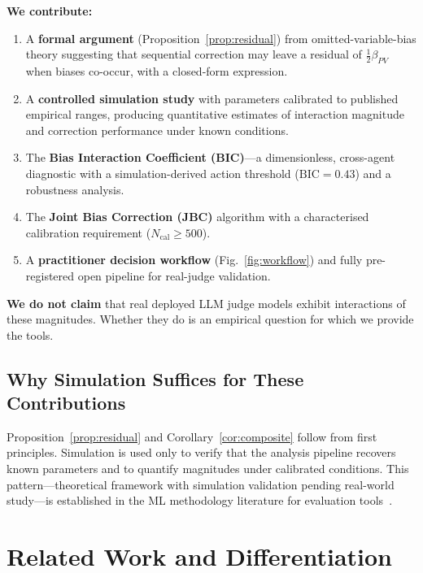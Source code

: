 \documentclass[10pt,conference]{IEEEtran}
\newcommand{\BIC}{\mathrm{BIC}}
\begin{document}
\textbf{We contribute:}
\begin{enumerate}
\item A \textbf{formal argument}
  (Proposition~\ref{prop:residual}) from
  omitted-variable-bias theory suggesting that sequential
  correction may leave a residual of $\frac{1}{2}\beta_{PV}$
  when biases co-occur, with a closed-form expression.

\item A \textbf{controlled simulation study} with parameters
  calibrated to published empirical ranges, producing
  quantitative estimates of interaction magnitude and
  correction performance under known conditions.

\item The \textbf{Bias Interaction Coefficient (BIC)}---a
  dimensionless, cross-agent diagnostic with a
  simulation-derived action threshold ($\BIC{=}0.43$)
  and a robustness analysis.

\item The \textbf{Joint Bias Correction (JBC)} algorithm
  with a characterised calibration requirement
  ($N_\text{cal}{\geq}500$).

\item A \textbf{practitioner decision workflow}
  (Fig.~\ref{fig:workflow}) and fully pre-registered
  open pipeline for real-judge validation.
\end{enumerate}

\textbf{We do not claim} that real deployed LLM judge
models exhibit interactions of these magnitudes.
Whether they do is an empirical question for which we
provide the tools.

\subsection{Why Simulation Suffices for These Contributions}

Proposition~\ref{prop:residual} and Corollary~\ref{cor:composite}
follow from first principles.
Simulation is used only to verify that the analysis pipeline
recovers known parameters and to quantify magnitudes under
calibrated conditions.
This pattern---theoretical framework with simulation
validation pending real-world study---is established in the
ML methodology literature for evaluation
tools~\cite{guo2017calibration,yang2023}.

\section{Related Work and Differentiation}
\label{sec:related}
\end{document}
